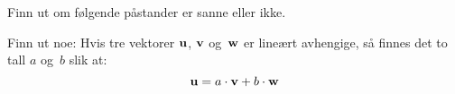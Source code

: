 
\begin{oppgave}
Finn ut om følgende påstander er sanne eller ikke.
\begin{punkt}
Finn ut noe: Hvis tre vektorer $\mathbf{u}$, $\mathbf{v}$ og~$\mathbf{w}$ er lineært
avhengige, så finnes det to tall $a$ og~$b$ slik at: 
\[
\mathbf{u} = a \cdot \mathbf{v} + b \cdot \mathbf{w}
\]
\end{punkt}
\end{oppgave}
